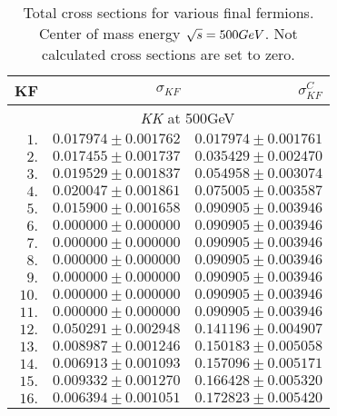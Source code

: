 \documentclass[12pt]{article}
\begin{document}
 
\begin{table}[!ht]
\centering
\caption{\footnotesize\sf
Total cross sections for various final fermions.                                
Center of mass energy $\protect\sqrt{s}=500 GeV$.                               
Not calculated cross sections are set to zero.                                  
}
\begin{tabular}                                                                                          {||r|r|r||}
\hline\hline
KF                              &
$\sigma_{KF}$                   &
$\sigma_{KF}^C$                 
\\
\hline
& \multicolumn{ 2}{c||}{
      {\sl KK} at 500GeV                                                              }
\\
\hline
$        1.$ & $  0.017974\pm0.001762$ & $  0.017974\pm0.001761$
\\
$        2.$ & $  0.017455\pm0.001737$ & $  0.035429\pm0.002470$
\\
$        3.$ & $  0.019529\pm0.001837$ & $  0.054958\pm0.003074$
\\
$        4.$ & $  0.020047\pm0.001861$ & $  0.075005\pm0.003587$
\\
$        5.$ & $  0.015900\pm0.001658$ & $  0.090905\pm0.003946$
\\
$        6.$ & $  0.000000\pm0.000000$ & $  0.090905\pm0.003946$
\\
$        7.$ & $  0.000000\pm0.000000$ & $  0.090905\pm0.003946$
\\
$        8.$ & $  0.000000\pm0.000000$ & $  0.090905\pm0.003946$
\\
$        9.$ & $  0.000000\pm0.000000$ & $  0.090905\pm0.003946$
\\
$       10.$ & $  0.000000\pm0.000000$ & $  0.090905\pm0.003946$
\\
$       11.$ & $  0.000000\pm0.000000$ & $  0.090905\pm0.003946$
\\
$       12.$ & $  0.050291\pm0.002948$ & $  0.141196\pm0.004907$
\\
$       13.$ & $  0.008987\pm0.001246$ & $  0.150183\pm0.005058$
\\
$       14.$ & $  0.006913\pm0.001093$ & $  0.157096\pm0.005171$
\\
$       15.$ & $  0.009332\pm0.001270$ & $  0.166428\pm0.005320$
\\
$       16.$ & $  0.006394\pm0.001051$ & $  0.172823\pm0.005420$
\\
\hline\hline
\end{tabular}
\end{table}
\end{document}
